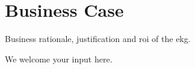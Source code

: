\section{Business Case}\label{sec:ekg-mm-b-1-2} %

Business rationale, justification and \gls{roi} of the \gls{ekg}.

We welcome your input here.

